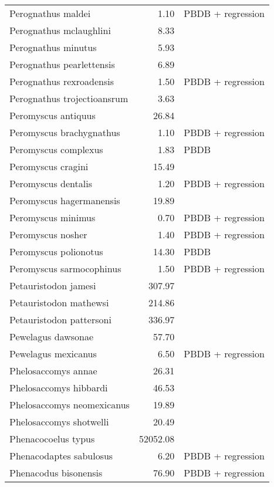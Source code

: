 \begin{table}[ht]
\begin{tabular}{lrl}
  Perognathus maldei & 1.10 & PBDB + regression \\ 
  Perognathus mclaughlini & 8.33 & \cite{Tomiya2013} \\ 
  Perognathus minutus & 5.93 & \cite{Tomiya2013} \\ 
  Perognathus pearlettensis & 6.89 & \cite{Tomiya2013} \\ 
  Perognathus rexroadensis & 1.50 & PBDB + regression \\ 
  Perognathus trojectioansrum & 3.63 & \cite{Tomiya2013} \\ 
  Peromyscus antiquus & 26.84 & \cite{Tomiya2013} \\ 
  Peromyscus brachygnathus & 1.10 & PBDB + regression \\ 
  Peromyscus complexus & 1.83 & PBDB \\ 
  Peromyscus cragini & 15.49 & \cite{Tomiya2013} \\ 
  Peromyscus dentalis & 1.20 & PBDB + regression \\ 
  Peromyscus hagermanensis & 19.89 & \cite{Tomiya2013} \\ 
  Peromyscus minimus & 0.70 & PBDB + regression \\ 
  Peromyscus nosher & 1.40 & PBDB + regression \\ 
  Peromyscus polionotus & 14.30 & PBDB \\ 
  Peromyscus sarmocophinus & 1.50 & PBDB + regression \\ 
  Petauristodon jamesi & 307.97 & \cite{Tomiya2013} \\ 
  Petauristodon mathewsi & 214.86 & \cite{Tomiya2013} \\ 
  Petauristodon pattersoni & 336.97 & \cite{Tomiya2013} \\ 
  Pewelagus dawsonae & 57.70 & \cite{Jepsen1932} \\ 
  Pewelagus mexicanus & 6.50 & PBDB + regression \\ 
  Phelosaccomys annae & 26.31 & \cite{Tomiya2013} \\ 
  Phelosaccomys hibbardi & 46.53 & \cite{Tomiya2013} \\ 
  Phelosaccomys neomexicanus & 19.89 & \cite{Tomiya2013} \\ 
  Phelosaccomys shotwelli & 20.49 & \cite{Tomiya2013} \\ 
  Phenacocoelus typus & 52052.08 & \cite{Tomiya2013} \\ 
  Phenacodaptes sabulosus & 6.20 & PBDB + regression \\ 
  Phenacodus bisonensis & 76.90 & PBDB + regression \\ 

\end{tabular}
\end{table}

